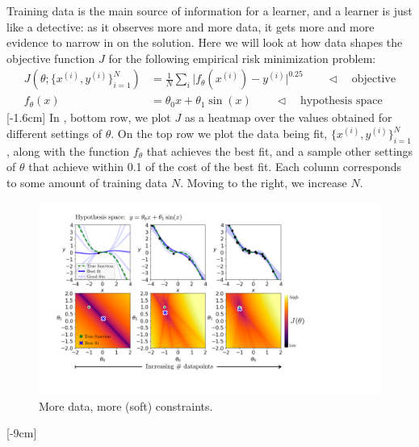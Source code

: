 Training data is the main source of information for a learner, and a learner is just like a detective: as it observes more and more data, it gets more and more evidence to narrow in on the solution. Here we will look at how data shapes the objective function $J$ for the following empirical risk minimization problem:
\begin{align}
    J(\theta; \{x^{(i)}, y^{(i)}\}^N_{i=1}) &= \frac{1}{N}\sum_i \lvert f_{\theta}(x^{(i)}) - y^{(i)}\rvert^{0.25} \quad\quad \triangleleft \quad\text{objective}\label{eqn:problem_of_generalization:error_fn_1}\\
    f_{\theta}(x) &= \theta_0 x + \theta_1 \sin(x)  \quad\quad \triangleleft \quad\text{hypothesis space}
\end{align}[-1.6cm]
In \fig{\ref{fig:problem_of_generalization:more_data_more_constraints}}, bottom row, we plot $J$ as a heatmap over the values obtained for different settings of $\theta$. On the top row we plot the data being fit, $\{x^{(i)}, y^{(i)}\}^N_{i=1}$, along with the function $f_{\theta}$ that achieves the best fit, and a sample other settings of $\theta$ that achieve within 0.1 of the cost of the best fit. Each column corresponds to some amount of training data $N$. Moving to the right, we increase $N$.

\begin{figure}[t]
    \centerline{
    \includegraphics[width=1.0\linewidth]{./figures/problem_of_generalization/more_data_more_constraints.pdf}
    }
    \caption{More data, more (soft) constraints.}
    \label{fig:problem_of_generalization:more_data_more_constraints}
\end{figure}
[-9cm]

